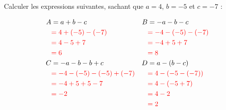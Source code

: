 \documentclass[Controle-correction]{subfiles}
\begin{document}
\begin{exercice}[(6 points)]

	Calculer les expressions suivantes, sachant que $a = 4$, $b = -5$ et $c = -7$ :

	\begin{align*}
		A & = a + b - c                            & B & = -a - b - c                    \\
		  & \correction{= 4 + (-5) - (-7)}         &   & \correction{= -4 - (-5) - (-7)} \\
		  & \correction{= 4 - 5 + 7}               &   & \correction{= -4 + 5 + 7}       \\
		  & \correction{= 6}                       &   & \correction{= 8}                \\
		C & = -a - b - b + c                       & D & = a - (b - c)                   \\
		  & \correction{= -4 - (-5) - (-5) + (-7)} &   & \correction{= 4 - (-5 - (-7))}  \\
		  & \correction{= -4 + 5 + 5 - 7}          &   & \correction{= 4 - (-5 + 7)}     \\
		  & \correction{= -2}                      &   & \correction{= 4 - 2}            \\
		  &                                        &   & \correction{= 2}                \\
	\end{align*}
\end{exercice}
\end{document}
